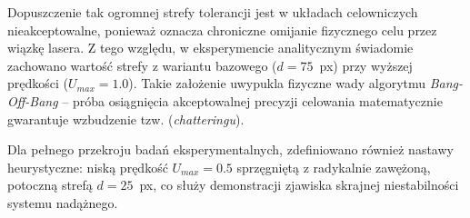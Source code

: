 \documentclass[a4paper,twoside,12pt]{book}
\begin{document}
Dopuszczenie tak ogromnej strefy tolerancji jest w układach celowniczych nieakceptowalne, ponieważ oznacza chroniczne omijanie fizycznego celu przez wiązkę lasera. Z tego względu, w eksperymencie analitycznym świadomie zachowano wartość strefy z wariantu bazowego ($d = 75$~px) przy wyższej prędkości ($U_{max} = 1.0$). Takie założenie uwypukla fizyczne wady algorytmu \textit{Bang-Off-Bang} -- próba osiągnięcia akceptowalnej precyzji celowania matematycznie gwarantuje wzbudzenie tzw. (\textit{chatteringu}). 

Dla pełnego przekroju badań eksperymentalnych, zdefiniowano również nastawy heurystyczne: niską prędkość $U_{max} = 0.5$ sprzęgniętą z radykalnie zawężoną, potoczną strefą $d = 25$~px, co służy demonstracji zjawiska skrajnej niestabilności systemu nadążnego.

\end{document}
